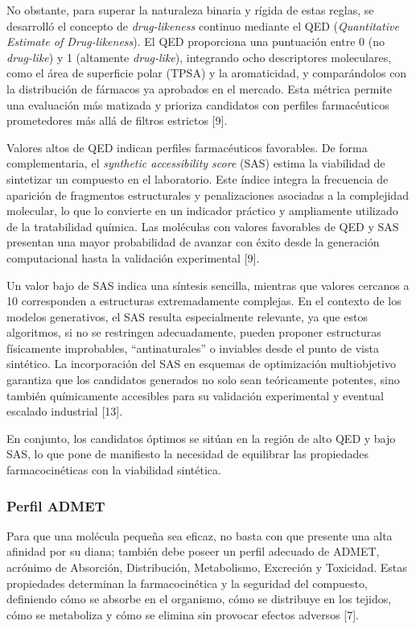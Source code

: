 \documentclass[IB]{TFUOC}%
\begin{document}
No obstante, para superar la naturaleza binaria y rígida de estas reglas, se desarrolló el concepto de \textit{drug-likeness} continuo mediante el QED (\textit{Quantitative Estimate of Drug-likeness}). El QED proporciona una puntuación entre 0 (no \textit{drug-like}) y 1 (altamente \textit{drug-like}), integrando ocho descriptores moleculares, como el área de superficie polar (TPSA) y la aromaticidad, y comparándolos con la distribución de fármacos ya aprobados en el mercado. Esta métrica permite una evaluación más matizada y prioriza candidatos con perfiles farmacéuticos prometedores más allá de filtros estrictos [9].

Valores altos de QED indican perfiles farmacéuticos favorables. De forma complementaria, el \textit{synthetic accessibility score} (SAS) estima la viabilidad de sintetizar un compuesto en el laboratorio. Este índice integra la frecuencia de aparición de fragmentos estructurales y penalizaciones asociadas a la complejidad molecular, lo que lo convierte en un indicador práctico y ampliamente utilizado de la tratabilidad química. Las moléculas con valores favorables de QED y SAS presentan una mayor probabilidad de avanzar con éxito desde la generación computacional hasta la validación experimental [9].

Un valor bajo de SAS indica una síntesis sencilla, mientras que valores cercanos a 10 corresponden a estructuras extremadamente complejas. En el contexto de los modelos generativos, el SAS resulta especialmente relevante, ya que estos algoritmos, si no se restringen adecuadamente, pueden proponer estructuras físicamente improbables, ``antinaturales'' o inviables desde el punto de vista sintético. La incorporación del SAS en esquemas de optimización multiobjetivo garantiza que los candidatos generados no solo sean teóricamente potentes, sino también químicamente accesibles para su validación experimental y eventual escalado industrial [13].

En conjunto, los candidatos óptimos se sitúan en la región de alto QED y bajo SAS, lo que pone de manifiesto la necesidad de equilibrar las propiedades farmacocinéticas con la viabilidad sintética.

\subsubsection{Perfil ADMET}

Para que una molécula pequeña sea eficaz, no basta con que presente una alta afinidad por su diana; también debe poseer un perfil adecuado de ADMET, acrónimo de Absorción, Distribución, Metabolismo, Excreción y Toxicidad. Estas propiedades determinan la farmacocinética y la seguridad del compuesto, definiendo cómo se absorbe en el organismo, cómo se distribuye en los tejidos, cómo se metaboliza y cómo se elimina sin provocar efectos adversos [7].
\end{document}
